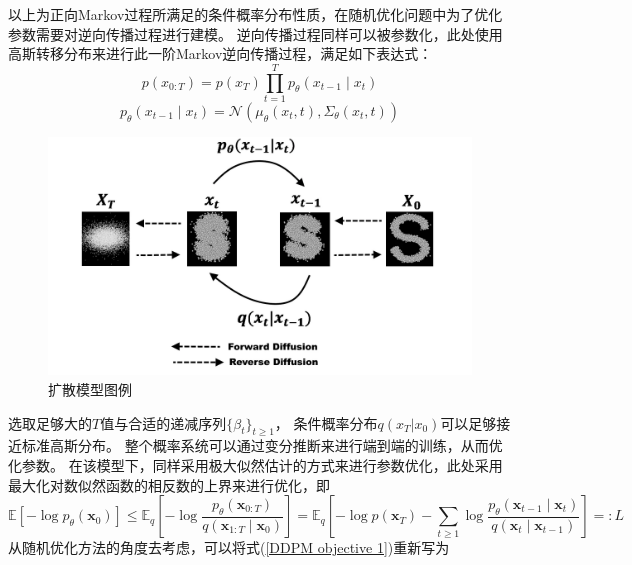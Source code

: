 以上为正向Markov过程所满足的条件概率分布性质，在随机优化问题中为了优化参数需要对逆向传播过程进行建模。
逆向传播过程同样可以被参数化，此处使用高斯转移分布来进行此一阶Markov逆向传播过程，满足如下表达式：
\begin{equation}
    p\left(x_{0: T}\right)=p\left(x_T\right) \prod_{t=1}^T p_\theta\left(x_{t-1} \mid x_t\right)
    \end{equation}
    \begin{equation}
        p_\theta\left(x_{t-1} \mid x_t\right)=\mathcal{N}\left(\mu_\theta\left(x_t, t\right), \Sigma_\theta\left(x_t, t\right)\right)
        \end{equation}
        \begin{figure}[H]
            \centering
            \includegraphics[scale = 0.2]{ThuThesis_ Tsinghua University Thesis LaTeX Template/Picture/Diffusion.png}
            \caption{扩散模型图例}
            \label{Diffusion}
        \end{figure}
选取足够大的$T$值与合适的递减序列$\{\beta_t\}_{t\geq 1}$， 条件概率分布$q(x_{T}|x_0)$可以足够接近标准高斯分布。
整个概率系统可以通过变分推断来进行端到端的训练，从而优化参数。
在该模型下，同样采用极大似然估计的方式来进行参数优化，此处采用最大化对数似然函数的相反数的上界来进行优化，即
\begin{equation}
    \mathbb{E}\left[-\log p_\theta\left(\mathbf{x}_0\right)\right] \leq \mathbb{E}_q\left[-\log \frac{p_\theta\left(\mathbf{x}_{0: T}\right)}{q\left(\mathbf{x}_{1: T} \mid \mathbf{x}_0\right)}\right]=\mathbb{E}_q\left[-\log p\left(\mathbf{x}_T\right)-\sum_{t \geq 1} \log \frac{p_\theta\left(\mathbf{x}_{t-1} \mid \mathbf{x}_t\right)}{q\left(\mathbf{x}_t \mid \mathbf{x}_{t-1}\right)}\right]=: L
    \label{DDPM objective 1}
\end{equation}
从随机优化方法的角度去考虑，可以将式(\ref{DDPM objective 1})重新写为
